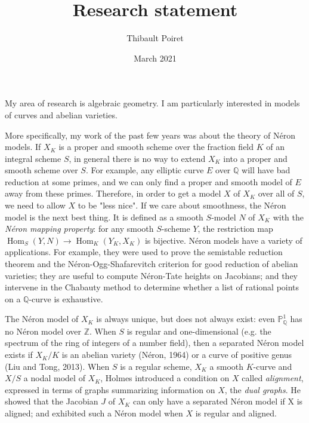 \documentclass[12pt]{extarticle}
\title{Research statement}
\author{Thibault Poiret}
\date{March 2021}
\DeclareMathOperator{\Hom}{Hom}
\begin{document}
\maketitle

My area of research is algebraic geometry. I am particularly interested in models of curves and abelian varieties.

More specifically, my work of the past few years was about the theory of Néron models. If $X_K$ is a proper and smooth scheme over the fraction field $K$ of an integral scheme $S$, in general there is no way to extend $X_K$ into a proper and smooth scheme over $S$. For example, any elliptic curve $E$ over $\mathbb Q$ will have bad reduction at some primes, and we can only find a proper and smooth model of $E$ away from these primes. Therefore, in order to get a model $X$ of $X_K$ over all of $S$, we need to allow $X$ to be "less nice". If we care about smoothness, the Néron model is the next best thing. It is defined as a smooth $S$-model $N$ of $X_K$ with the \emph{Néron mapping property}: for any smooth $S$-scheme $Y$, the restriction map $\Hom_S(Y,N) \to \Hom_K(Y_K,X_K)$ is bijective. Néron models have a variety of applications. For example, they were used to prove the semistable reduction theorem and the Néron-Ogg-Shafarevitch criterion for good reduction of abelian varieties; they are useful to compute Néron-Tate heights on Jacobians; and they intervene in the Chabauty method to determine whether a list of rational points on a $\mathbb Q$-curve is exhaustive.

The Néron model of $X_K$ is always unique, but does not always exist: even $\mathbb P^1_{\mathbb Q}$ has no Néron model over $\mathbb Z$. When $S$ is regular and one-dimensional (e.g. the spectrum of the ring of integers of a number field), then a separated Néron model exists if $X_K/K$ is an abelian variety (Néron, 1964) or a curve of positive genus (Liu and Tong, 2013). When $S$ is a regular scheme, $X_K$ a smooth $K$-curve and $X/S$ a nodal model of $X_K$, Holmes introduced a condition on $X$ called \emph{alignment}, expressed in terms of graphs summarizing information on $X$, the \emph{dual graphs}. He showed that the Jacobian $J$ of $X_K$ can only have a separated Néron model if X is aligned; and exhibited such a Néron model when $X$ is regular and aligned.
\end{document}
